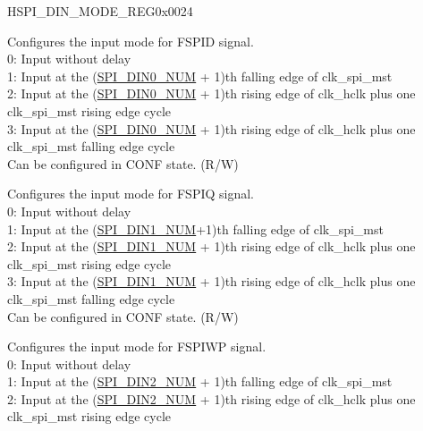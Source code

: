 \begin{register}{H}{SPI\_DIN\_MODE\_REG}{0x0024}\label{regdesc:SPIDINMODEREG}
%
%
%
%
%
%
%
\regnewline%
\begin{regdesc}\begin{reglist}
\label{fielddesc:SPIDIN0MODE}\item [SPI\_DIN0\_MODE] Configures the input mode for FSPID signal. \\
0: Input without delay \\
1: Input at the (\hyperref[fielddesc:SPIDIN0NUM]{SPI\_DIN0\_NUM} + 1)th falling edge of clk\_spi\_mst \\
2: Input at the (\hyperref[fielddesc:SPIDIN0NUM]{SPI\_DIN0\_NUM} + 1)th rising edge of clk\_hclk plus one clk\_spi\_mst rising edge cycle \\
3: Input at the (\hyperref[fielddesc:SPIDIN0NUM]{SPI\_DIN0\_NUM} + 1)th rising edge of clk\_hclk plus one clk\_spi\_mst falling edge cycle \\
Can be configured in CONF state. (R/W)
\label{fielddesc:SPIDIN1MODE}\item [SPI\_DIN1\_MODE] Configures the input mode for FSPIQ signal. \\
0: Input without delay \\
1: Input at the (\hyperref[fielddesc:SPIDIN1NUM]{SPI\_DIN1\_NUM}+1)th falling edge of clk\_spi\_mst \\
2: Input at the (\hyperref[fielddesc:SPIDIN1NUM]{SPI\_DIN1\_NUM} + 1)th rising edge of clk\_hclk plus one clk\_spi\_mst rising edge cycle \\
3: Input at the (\hyperref[fielddesc:SPIDIN1NUM]{SPI\_DIN1\_NUM} + 1)th rising edge of clk\_hclk plus one clk\_spi\_mst falling edge cycle \\
 Can be configured in CONF state. (R/W)
\label{fielddesc:SPIDIN2MODE}\item [SPI\_DIN2\_MODE] Configures the input mode for FSPIWP signal. \\
0: Input without delay \\
1: Input at the (\hyperref[fielddesc:SPIDIN2NUM]{SPI\_DIN2\_NUM} + 1)th falling edge of clk\_spi\_mst \\
2: Input at the (\hyperref[fielddesc:SPIDIN2NUM]{SPI\_DIN2\_NUM} + 1)th rising edge of clk\_hclk plus one clk\_spi\_mst rising edge cycle \\

\end{reglist}
\end{regdesc}
\end{register}
